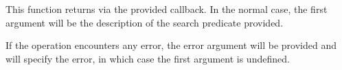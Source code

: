 This function returns via the provided callback.  In the normal case, the first
argument will be the description of the search predicate provided.

If the operation encounters any error, the error argument will be provided and
will specify the error, in which case the first argument is undefined.
